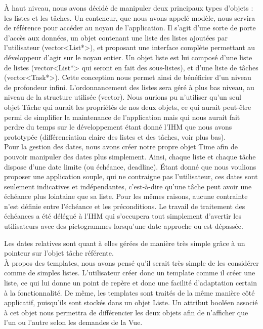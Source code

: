 		À haut niveau, nous avons décidé de manipuler deux principaux types d'objets : les listes et les tâches. Un conteneur, que nous avons appelé modèle, nous servira de référence pour accéder au noyau de l'application. Il s'agit d'une sorte de porte d'accès aux données, un objet contenant une liste des listes ajoutées par l'utilisateur (vector<List*>), et proposant une interface complète permettant au développeur d'agir sur le noyau entier. Un objet liste est lui composé d'une liste de listes (vector<List*> qui seront en fait des sous-listes), et d'une liste de tâches (vector<Task*>). Cette conception nous permet ainsi de bénéficier d'un niveau de profondeur infini. L'ordonnancement des listes sera géré à plus bas niveau, au niveau de la structure utilisée (vector).
		Nous aurions pu n'utiliser qu'un seul objet Tâche qui aurait les propriétés de nos deux objets, ce qui aurait peut-être permi de simplifier la maintenance de l'application mais qui nous aurait fait perdre du temps sur le développement étant donné l'IHM que nous avons prototypée (différenciation claire des listes et des tâches, voir plus bas).\\
		
		Pour la gestion des dates, nous avons créer notre propre objet Time afin de pouvoir manipuler des dates plus simplement. Ainsi, chaque liste et chaque tâche dispose d'une date limite (ou échéance, deadline). Étant donné que nous voulions proposer une application souple, qui ne contraigne pas l'utilisateur, ces dates sont seulement indicatives et indépendantes, c'est-à-dire qu'une tâche peut avoir une échéance plus lointaine que sa liste. Pour les mêmes raisons, aucune contrainte n'est définie entre l'échéance et les préconditions. Le travail de traitement des échéances a été délégué à l'IHM qui s'occupera tout simplement d'avertir les utilisateurs avec des pictogrammes lorsqu'une date approche ou est dépassée.
		
		Les dates relatives sont quant à elles gérées de manière très simple grâce à un pointeur sur l'objet tâche référente.\\
		
		À propos des templates, nous avons pensé qu'il serait très simple de les considérer comme de simples listes. L'utilisateur créer donc un template comme il créer une liste, ce qui lui donne un point de repère et donc une facilité d'adaptation certain à la fonctionnalité. De même, les templates sont traités de la même manière côté applicatif, puisqu'ils sont stockés dans un objet Liste. Un attribut booléen associé à cet objet nous permettra de différencier les deux objets afin de n'afficher que l'un ou l'autre selon les demandes de la Vue.
		
